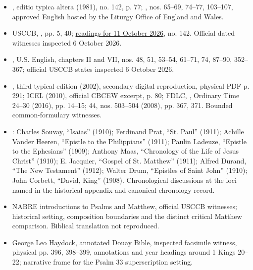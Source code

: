 \begin{itemize}
\item {}, editio typica altera (1981), no. 142, p. 77; , nos. 65--69, 74--77, 103--107, approved English hosted by the Liturgy Office of England and Wales.
\item USCCB, , pp. 5, 40; \href{https://bible.usccb.org/bible/readings/101126.cfm}{readings for 11 October 2026}, no. 142. Official dated witnesses inspected 6 October 2026.
\item {}, U.S. English, chapters II and VII, nos. 48, 51, 53--54, 61--71, 74, 87--90, 352--367; official USCCB states inspected 6 October 2026.
\item {}, third typical edition (2002), secondary digital reproduction, physical PDF p. 291; ICEL  (2010), official CBCEW excerpt, p. 80; FDLC, , Ordinary Time 24--30 (2016), pp. 14--15;  44, nos. 503--504 (2008), pp. 367, 371. Bounded common-formulary witnesses.
\item {}: Charles Souvay, ``Isaias'' (1910); Ferdinand Prat, ``St. Paul'' (1911); Achille Vander Heeren, ``Epistle to the Philippians'' (1911); Paulin Ladeuze, ``Epistle to the Ephesians'' (1909); Anthony Maas, ``Chronology of the Life of Jesus Christ'' (1910); E. Jacquier, ``Gospel of St. Matthew'' (1911); Alfred Durand, ``The New Testament'' (1912); Walter Drum, ``Epistles of Saint John'' (1910); John Corbett, ``David, King'' (1908). Chronological discussions at the loci named in the historical appendix and canonical chronology record.
\item NABRE introductions to Psalms and Matthew, official USCCB witnesses; historical setting, composition boundaries and the distinct critical Matthew comparison. Biblical translation not reproduced.
\item George Leo Haydock, annotated Douay Bible, inspected facsimile witness, physical pp. 396, 398--399, annotations and year headings around 1 Kings 20--22; narrative frame for the Psalm 33 superscription setting.
\end{itemize}
